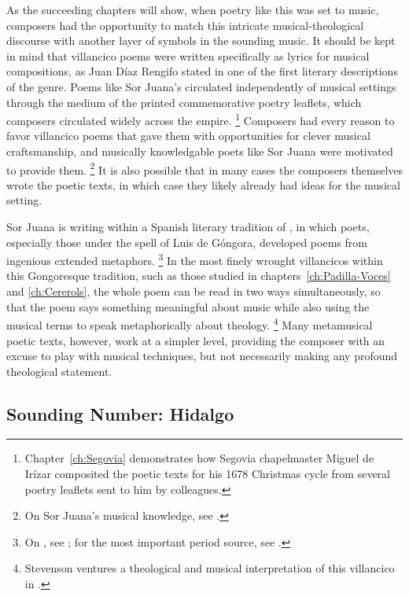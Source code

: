 As the succeeding chapters will show, when poetry like this was set to music, composers had the opportunity to match this intricate musical-theological discourse with another layer of symbols in the sounding music.
It should be kept in mind that villancico poems were written specifically as lyrics for musical compositions, as Juan Díaz Rengifo stated in one of the first literary descriptions of the genre.
	\autocite{Rengifo:ArteMetrica}
Poems like Sor Juana's circulated independently of musical settings through the medium of the printed commemorative poetry leaflets, which composers circulated widely across the empire.%
	\footnote{%
	Chapter~\ref{ch:Segovia} demonstrates how Segovia chapelmaster Miguel de Irízar composited the poetic texts for his 1678 Christmas cycle from several poetry leaflets sent to him by colleagues.
	}
Composers had every reason to favor villancico poems that gave them with opportunities for clever musical craftsmanship, and musically knowledgable poets like Sor Juana were motivated to provide them.%
	\footnote{%
	On Sor Juana's musical knowledge, see \autocite{Stevenson:SorJuanaMusicalRapports}.
	}
It is also possible that in many cases the composers themselves wrote the poetic texts, in which case they likely already had ideas for the musical setting.

Sor Juana is writing within a Spanish literary tradition of , in which poets, especially those under the spell of Luis de Góngora, developed poems from ingenious extended metaphors.%
	\footnote{%
	On , see \autocites{Tenorio:Gongorismo}[227--228]{Gaylord:Poetry}; for the most important period source, see \autocite{Gracian:Ingenio}. 
	}
In the most finely wrought villancicos within this Gongoresque tradition, such as those studied in chapters~\ref{ch:Padilla-Voces} and \ref{ch:Cererols}, the whole poem can be read in two ways simultaneously, so that the poem says something meaningful about music while also using the musical terms to speak metaphorically about theology.%
	\footnote{%
	Stevenson ventures a theological and musical interpretation of this villancico in .
	}
Many metamusical poetic texts, however, work at a simpler level, providing the composer with an excuse to play with musical techniques, but not necessarily making any profound theological statement.


\subsection{Sounding Number: Hidalgo}

